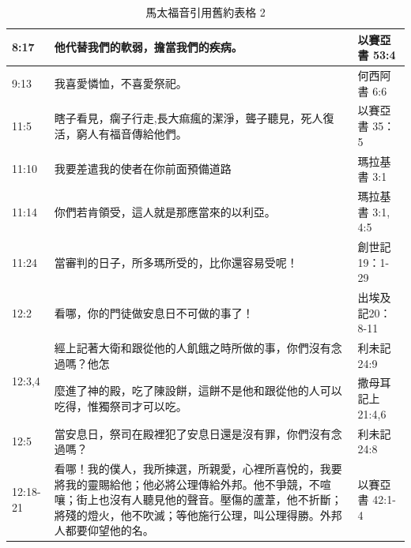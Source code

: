 \begin{table}[htbp]
\begin{tabular}{|p{4.2em}|p{31.645em}|p{7.3em}|}
    \midrule
    8:17  & 他代替我們的軟弱，擔當我們的疾病。 & 以賽亞書 53:4 \\
    \midrule
    9:13  & 我喜愛憐恤，不喜愛祭祀。 & 何西阿書 6:6 \\
    \midrule
    11:5  & 瞎子看見，瘸子行走,長大痲瘋的潔淨，聾子聽見，死人復活，窮人有福音傳給他們。 & 以賽亞書 35：5 \\
    \midrule
    11:10 & 我要差遣我的使者在你前面預備道路 & 瑪拉基書 3:1 \\
    \midrule
    11:14 & 你們若肯領受，這人就是那應當來的以利亞。 & 瑪拉基書 3:1, 4:5 \\
    \midrule
    11:24 & 當審判的日子，所多瑪所受的，比你還容易受呢！ & 創世記19：1-29 \\
    \midrule
    12:2  & 看哪，你的門徒做安息日不可做的事了！ & 出埃及記20：8-11 \\
    \midrule
    \multirow{2}[4]{*}{12:3,4} & 經上記著大衛和跟從他的人飢餓之時所做的事，你們沒有念過嗎？他怎 & 利未記 24:9 \\
\cmidrule{3-3}    \multicolumn{1}{|l|}{} & 麼進了神的殿，吃了陳設餅，這餅不是他和跟從他的人可以吃得，惟獨祭司才可以吃。 & 撒母耳記上 21:4,6 \\
    \midrule
    12:5  & 當安息日，祭司在殿裡犯了安息日還是沒有罪，你們沒有念過嗎？ & 利未記 24:8 \\
    \midrule
    12:18-21 & 看哪！我的僕人，我所揀選，所親愛，心裡所喜悅的，我要將我的靈賜給他；他必將公理傳給外邦。他不爭競，不喧嚷；街上也沒有人聽見他的聲音。壓傷的蘆葦，他不折斷；將殘的燈火，他不吹滅；等他施行公理，叫公理得勝。外邦人都要仰望他的名。 & 以賽亞書 42:1-4 \\
    \bottomrule
    \end{tabular}%
  \label{tab:addlabel}%
   \caption{馬太福音引用舊約表格 2}
\end{table}%





